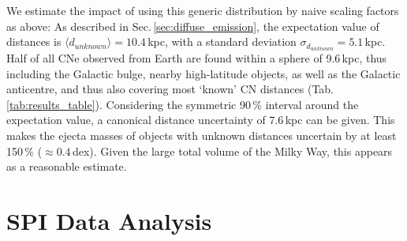 \documentclass{aa}
\begin{document}
We estimate the impact of using this generic distribution by naive scaling factors as above:
%
As described in Sec.\,\ref{sec:diffuse_emission}, the expectation value of distances is $\langle d_{unknown} \rangle = 10.4$\,kpc, with a standard deviation $\sigma_{d_{unknown}} = 5.1$\,kpc.
%
Half of all CNe observed from Earth are found within a sphere of 9.6\,kpc, thus including the Galactic bulge, nearby high-latitude objects, as well as the Galactic anticentre, and thus also covering most `known' CN distances (Tab.\,\ref{tab:results_table}).
%
Considering the symmetric 90\,\% interval around the expectation value, a canonical distance uncertainty of $7.6$\,kpc can be given.
%
This makes the ejecta masses of objects with unknown distances uncertain by at least 150\,\% ($\approx 0.4$\,dex).
%
Given the large total volume of the Milky Way, this appears as a reasonable estimate.



\section{SPI Data Analysis}\label{sec:data_analysis}
\end{document}
